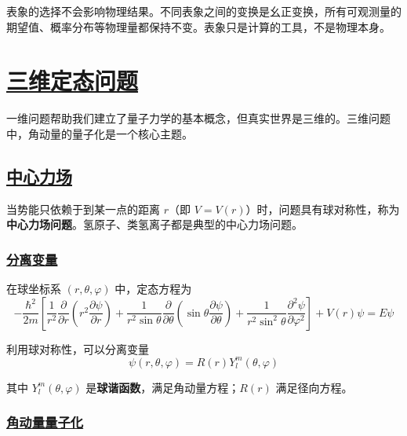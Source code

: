 \begin{remark}
    表象的选择不会影响物理结果。不同表象之间的变换是幺正变换，所有可观测量的期望值、概率分布等物理量都保持不变。表象只是计算的工具，不是物理本身。
\end{remark}






\section{\protect\hyperlink{:}{三维定态问题}}

一维问题帮助我们建立了量子力学的基本概念，但真实世界是三维的。三维问题中，角动量的量子化是一个核心主题。

\subsection{\protect\hyperlink{:}{中心力场}}

当势能只依赖于到某一点的距离 $r$（即 $V = V(r)$）时，问题具有球对称性，称为\textbf{中心力场问题}。氢原子、类氢离子都是典型的中心力场问题。

\subsubsection{\protect\hyperlink{:}{分离变量}}

在球坐标系 $(r, \theta, \varphi)$ 中，定态方程为
\begin{equation}
    -\frac{\hbar^2}{2m}\left[\frac{1}{r^2}\frac{\partial}{\partial r}\left(r^2\frac{\partial\psi}{\partial r}\right) + \frac{1}{r^2\sin\theta}\frac{\partial}{\partial\theta}\left(\sin\theta\frac{\partial\psi}{\partial\theta}\right) + \frac{1}{r^2\sin^2\theta}\frac{\partial^2\psi}{\partial\varphi^2}\right] + V(r)\psi = E\psi
\end{equation}

利用球对称性，可以分离变量
\begin{equation}
    \psi(r,\theta,\varphi) = R(r)Y_l^m(\theta,\varphi)
\end{equation}

其中 $Y_l^m(\theta,\varphi)$ 是\textbf{球谐函数}，满足角动量方程；$R(r)$ 满足径向方程。

\subsubsection{\protect\hyperlink{:}{角动量量子化}}

